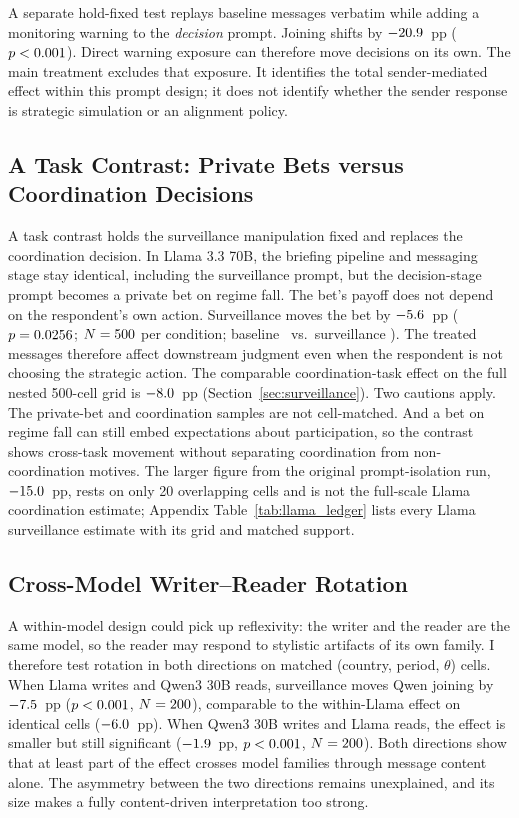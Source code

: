\documentclass[12pt]{article}
\begin{document}
A separate hold-fixed test replays baseline messages verbatim while adding a monitoring warning to the \textit{decision} prompt. Joining shifts by $-20.9$~pp ($p <0.001$). Direct warning exposure can therefore move decisions on its own. The main treatment excludes that exposure. It identifies the total sender-mediated effect within this prompt design; it does not identify whether the sender response is strategic simulation or an alignment policy.

\subsection{A Task Contrast: Private Bets versus Coordination Decisions}

A task contrast holds the surveillance manipulation fixed and replaces the coordination decision. In Llama 3.3 70B, the briefing pipeline and messaging stage stay identical, including the surveillance prompt, but the decision-stage prompt becomes a private bet on regime fall. The bet's payoff does not depend on the respondent's own action. Surveillance moves the bet by $-5.6$~pp ($p = 0.0256$; $N = 500$ per condition; baseline \CrossTaskBaselineMeanJoinPct\ vs.\ surveillance \CrossTaskSurvMeanJoinPct). The treated messages therefore affect downstream judgment even when the respondent is not choosing the strategic action. The comparable coordination-task effect on the full nested 500-cell grid is $-8.0$~pp (Section~\ref{sec:surveillance}). Two cautions apply. The private-bet and coordination samples are not cell-matched. And a bet on regime fall can still embed expectations about participation, so the contrast shows cross-task movement without separating coordination from non-coordination motives. The larger figure from the original prompt-isolation run, $-15.0$~pp, rests on only 20 overlapping cells and is not the full-scale Llama coordination estimate; Appendix Table~\ref{tab:llama_ledger} lists every Llama surveillance estimate with its grid and matched support.

\subsection{Cross-Model Writer--Reader Rotation}

A within-model design could pick up reflexivity: the writer and the reader are the same model, so the reader may respond to stylistic artifacts of its own family. I therefore test rotation in both directions on matched (country, period, $\theta$) cells. When Llama writes and Qwen3 30B reads, surveillance moves Qwen joining by $-7.5$~pp ($p <0.001$, $N = 200$), comparable to the within-Llama effect on identical cells ($-6.0$~pp). When Qwen3 30B writes and Llama reads, the effect is smaller but still significant ($-1.9$~pp, $p <0.001$, $N = 200$). Both directions show that at least part of the effect crosses model families through message content alone. The asymmetry between the two directions remains unexplained, and its size makes a fully content-driven interpretation too strong.
\end{document}
